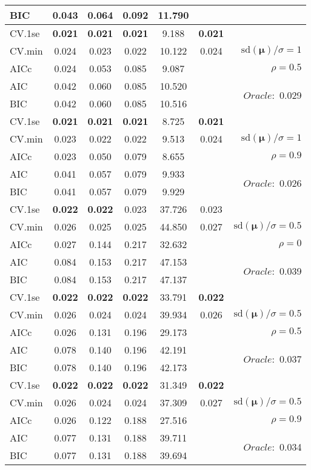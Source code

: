 \begin{table}
\begin{center}
\begin{tabular}{l*{5}{c}|r}
BIC & 0.043 & 0.064 & 0.092 & 11.790 & &  \\
 \hline 
CV.1se & {\bf 0.021} & {\bf 0.021} & {\bf 0.021} & 9.188 & {\bf 0.021} & \\
CV.min & 0.024 & 0.023 & 0.022 & 10.122 & 0.024 &  $\mathrm{sd}(\mathbf{\mu})/\sigma=1$ \\
AICc & 0.024 & 0.053 & 0.085 & 9.087 & & $\rho=0.5$ \\
AIC & 0.042 & 0.060 & 0.085 & 10.520 & &  \multirow{2}{*}{$Oracle: $ 0.029} \\
BIC & 0.042 & 0.060 & 0.085 & 10.516 & &  \\
 \hline 
CV.1se & {\bf 0.021} & {\bf 0.021} & {\bf 0.021} & 8.725 & {\bf 0.021} & \\
CV.min & 0.023 & 0.022 & 0.022 & 9.513 & 0.024 &  $\mathrm{sd}(\mathbf{\mu})/\sigma=1$ \\
AICc & 0.023 & 0.050 & 0.079 & 8.655 & & $\rho=0.9$ \\
AIC & 0.041 & 0.057 & 0.079 & 9.933 & &  \multirow{2}{*}{$Oracle: $ 0.026} \\
BIC & 0.041 & 0.057 & 0.079 & 9.929 & &  \\
 \hline 
CV.1se & {\bf 0.022} & {\bf 0.022} & 0.023 & 37.726 & 0.023 & \\
CV.min & 0.026 & 0.025 & 0.025 & 44.850 & 0.027 &  $\mathrm{sd}(\mathbf{\mu})/\sigma=0.5$ \\
AICc & 0.027 & 0.144 & 0.217 & 32.632 & & $\rho=0$ \\
AIC & 0.084 & 0.153 & 0.217 & 47.153 & &  \multirow{2}{*}{$Oracle: $ 0.039} \\
BIC & 0.084 & 0.153 & 0.217 & 47.137 & &  \\
 \hline 
CV.1se & {\bf 0.022} & {\bf 0.022} & {\bf 0.022} & 33.791 & {\bf 0.022} & \\
CV.min & 0.026 & 0.024 & 0.024 & 39.934 & 0.026 &  $\mathrm{sd}(\mathbf{\mu})/\sigma=0.5$ \\
AICc & 0.026 & 0.131 & 0.196 & 29.173 & & $\rho=0.5$ \\
AIC & 0.078 & 0.140 & 0.196 & 42.191 & &  \multirow{2}{*}{$Oracle: $ 0.037} \\
BIC & 0.078 & 0.140 & 0.196 & 42.173 & &  \\
 \hline 
CV.1se & {\bf 0.022} & {\bf 0.022} & {\bf 0.022} & 31.349 & {\bf 0.022} & \\
CV.min & 0.026 & 0.024 & 0.024 & 37.309 & 0.027 &  $\mathrm{sd}(\mathbf{\mu})/\sigma=0.5$ \\
AICc & 0.026 & 0.122 & 0.188 & 27.516 & & $\rho=0.9$ \\
AIC & 0.077 & 0.131 & 0.188 & 39.711 & &  \multirow{2}{*}{$Oracle: $ 0.034} \\
BIC & 0.077 & 0.131 & 0.188 & 39.694 & &  \\
 \hline 
\end{tabular}
\end{center}
\vspace{-1cm}
\end{table}




